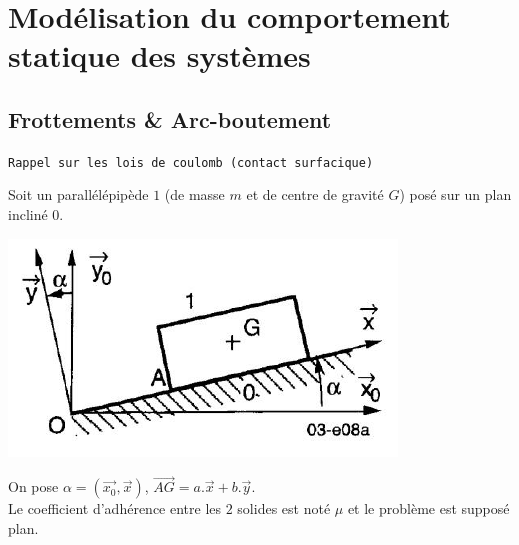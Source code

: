 \chapter{Modélisation du comportement statique des systèmes}
\thispagestyle{plain} %
\newpage


\section{Frottements \& Arc-boutement}

\texttt{Rappel sur les lois de coulomb (contact surfacique)}

Soit un parallélépipède $1$ (de masse $m$ et de centre de gravité $G$) posé
sur un plan incliné $0$.

\begin{center}
\includegraphics[scale=0.7]{png/plan_incline.png}
\end{center}

On pose $\alpha=(\overrightarrow{x_0},\overrightarrow{x})$, $\overrightarrow{AG}=a.\overrightarrow{x}+b.\overrightarrow{y}$.\\
Le coefficient d’adhérence entre les $2$ solides est noté $\mu$ et le problème est supposé plan.

